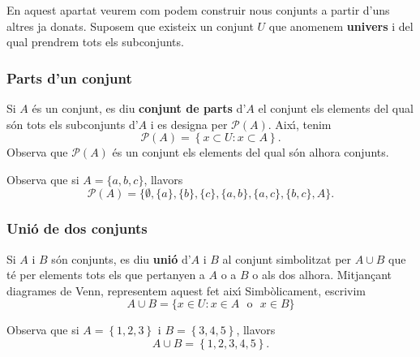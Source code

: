 En aquest apartat veurem com podem construir nous conjunts a partir d'uns
altres ja donats. Suposem que existeix un conjunt $U$ que anomenem \textbf{%
univers} i del qual prendrem tots els subconjunts.

\subsubsection{Parts d'un conjunt}

Si $A$ \'{e}s un conjunt, es diu \textbf{conjunt de parts} d'$A$ el conjunt
els elements del qual s\'{o}n tots els subconjunts d'$A$ i es designa per $%
\mathcal{P}(A)$. Aix\'{\i}, tenim%
\begin{equation*}
\mathcal{P}(A)=\left\{ x\subset U:x\subset A\right\} \text{.}
\end{equation*}
Observa que $\mathcal{P}(A)$ \'{e}s un conjunt els elements del qual s\'{o}n
alhora conjunts.

\bigskip

\begin{exemple}
Observa que si $A=\{a,b,c\}$, llavors%
\begin{equation*}
\mathcal{P}(A)=\{\emptyset ,\{a\},\{b\},\{c\},\{a,b\},\{a,c\},\{b,c\},A\}%
\text{.}
\end{equation*}
\end{exemple}

\subsubsection{Uni\'{o} de dos conjunts}

Si $A$ i $B$ s\'{o}n conjunts, es diu \textbf{uni\'{o}} d'$A$ i $B$ al
conjunt simbolitzat per $A\cup B$ que t\'{e} per elements tots els que
pertanyen a $A$ o a $B$ o als dos alhora. Mitjan\c{c}ant diagrames de Venn,
representem aquest fet aix\'{\i} 
Simb\`{o}licament, escrivim%
\begin{equation*}
A\cup B=\{x\in U:x\in A\text{ ~o~ }x\in B\}
\end{equation*}

\begin{exemple}
Observa que si $A=\left\{ 1,2,3\right\} $ i $B=\left\{ 3,4,5\right\} $,
llavors%
\begin{equation*}
A\cup B=\left\{ 1,2,3,4,5\right\} \text{.}
\end{equation*}
\end{exemple}

